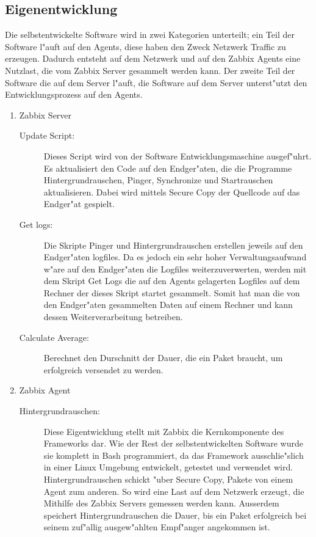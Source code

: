 \subsection{Eigenentwicklung}
Die selbstentwickelte Software wird in zwei Kategorien unterteilt; ein Teil der Software l"auft %
auf den Agents, diese haben den Zweck Netzwerk Traffic zu erzeugen. Dadurch entsteht auf dem Netzwerk und %
auf den Zabbix Agents eine Nutzlast, die vom Zabbix Server gesammelt werden kann. Der zweite Teil der Software %
die auf dem Server l"auft, die Software auf dem Server unterst"utzt den Entwicklungsprozess auf den Agents. %
\begin{enumerate}
\item Zabbix Server 
\begin{description}
\item[Update Script:]Dieses Script wird von der Software Entwicklungsmaschine ausgef"uhrt. Es aktualisiert den Code auf den Endger"aten, %
die die Programme Hintergrundrauschen, Pinger, Synchronize und Startrauschen aktualisieren. Dabei wird mittels Secure Copy %
der Quellcode auf das Endger"at gespielt.

\item[Get logs:]Die Skripte Pinger und Hintergrundrauschen erstellen jeweils auf den Endger"aten logfiles. %
Da es jedoch ein sehr hoher Verwaltungsaufwand w"are auf den Endger"aten die Logfiles weiterzuverwerten, %
werden mit dem Skript Get Logs die auf den Agents gelagerten Logfiles auf dem Rechner der dieses Skript %
startet gesammelt. Somit hat man die von den Endger"aten gesammelten Daten auf einem Rechner und kann %
dessen Weiterverarbeitung betreiben.      

\item[Calculate Average:]Berechnet den Durschnitt der Dauer, die ein Paket braucht, um erfolgreich versendet %
zu werden.
 
\end{description}

\item Zabbix Agent

\begin{description}
\item[Hintergrundrauschen:]Diese Eigentwicklung stellt mit Zabbix die Kernkomponente des Frameworks dar. Wie %
der Rest der selbstentwickelten Software wurde sie komplett in Bash programmiert, da das Framework ausschlie"slich %
in einer Linux Umgebung entwickelt, getestet und verwendet wird. Hintergrundrauschen schickt "uber Secure Copy, %
Pakete von einem Agent zum anderen. So wird eine %
Last auf dem Netzwerk erzeugt, die Mithilfe des Zabbix Servers gemessen werden kann. Ausserdem speichert Hintergrundrauschen %
die Dauer, bis ein Paket erfolgreich bei seinem zuf"allig ausgew"ahlten Empf"anger angekommen ist. %


\end{description}
\end{enumerate}
